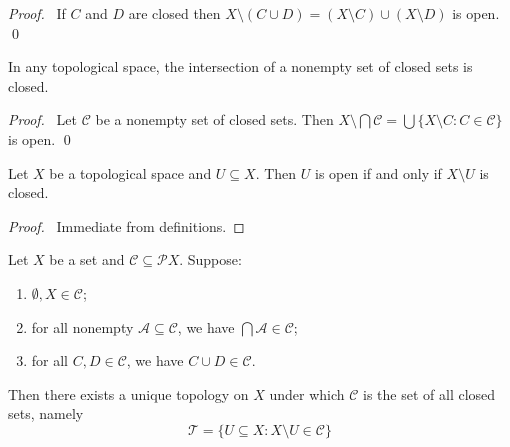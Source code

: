 \begin{proof}
  \pf\ If $C$ and $D$ are closed then $X \setminus (C \cup D) = (X \setminus
  C) \cup (X \setminus D)$ is open. \qed
\end{proof}

\begin{prop}
  \label{prop:topology:closed:intersection}
  In any topological space, the intersection of a nonempty set of closed sets
  is closed.
\end{prop}

\begin{proof}
  \pf\ Let $\mathcal{C}$ be a nonempty set of closed sets. Then $X \setminus
  \bigcap \mathcal{C} = \bigcup \{ X \setminus C : C \in \mathcal{C} \}$ is
  open. \qed
\end{proof}

\begin{prop}
  \label{prop:topology:closed:open}
  Let $X$ be a topological space and $U \subseteq X$. Then $U$ is open if and
  only if $X \setminus U$ is closed.
\end{prop}

\begin{proof}
  \pf\ Immediate from definitions.
\end{proof}

\begin{thm}
  \label{thm:topology:closed}
  Let $X$ be a set and $\mathcal{C} \subseteq \mathcal{P} X$. Suppose:
  \begin{enumerate}
    \item $\emptyset, X \in \mathcal{C}$;
    \item for all nonempty $\mathcal{A} \subseteq \mathcal{C}$, we have
    $\bigcap
    \mathcal{A} \in \mathcal{C}$;
    \item for all $C, D \in \mathcal{C}$, we have $C \cup D \in \mathcal{C}$.
  \end{enumerate}
  Then there exists a unique topology on $X$ under which $\mathcal{C}$ is the
  set of all closed sets, namely
  \[ \mathcal{T} = \{ U \subseteq X : X \setminus U \in \mathcal{C} \} \]
\end{thm}

